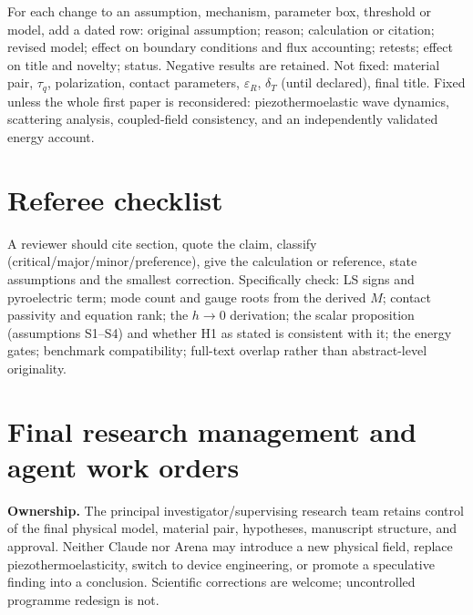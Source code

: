 \documentclass[11pt]{article}
\begin{document}
For each change to an assumption, mechanism, parameter box, threshold or model,
add a dated row: original assumption; reason; calculation or citation; revised
model; effect on boundary conditions and flux accounting; retests; effect on title
and novelty; status. Negative results are retained. Not fixed: material pair,
$\tau_q$, polarization, contact parameters, $\varepsilon_R$, $\delta_T$ (until
declared), final title. Fixed unless the whole first paper is reconsidered:
piezothermoelastic wave dynamics, scattering analysis, coupled-field consistency,
and an independently validated energy account.

\section{Referee checklist}

A reviewer should cite section, quote the claim, classify
(critical/major/minor/preference), give the calculation or reference, state
assumptions and the smallest correction. Specifically check: LS signs and
pyroelectric term; mode count and gauge roots from the derived $M$; contact
passivity and equation rank; the $h\to0$ derivation; the scalar proposition
(assumptions S1--S4) and whether H1 as stated is consistent with it; the energy
gates; benchmark compatibility; full-text overlap rather than abstract-level
originality.

\section{Final research management and agent work orders}

\textbf{Ownership.} The principal investigator/supervising research team retains
control of the final physical model, material pair, hypotheses, manuscript
structure, and approval. Neither Claude nor Arena may introduce a new physical
field, replace piezothermoelasticity, switch to device engineering, or promote a
speculative finding into a conclusion. Scientific corrections are welcome;
uncontrolled programme redesign is not.
\end{document}
